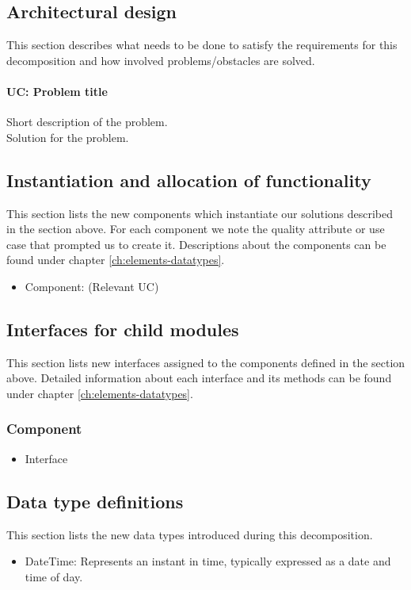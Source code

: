 \subsection{Architectural design}
    This section describes what needs to be done to satisfy the requirements for
    this decomposition and how involved problems/obstacles are solved.

    \paragraph{UC: Problem title}
        Short description of the problem.\\
        Solution for the problem.


\subsection{Instantiation and allocation of functionality}
    This section lists the new components which instantiate our solutions
    described in the section above. For each component we note the quality
    attribute or use case that prompted us to create it. Descriptions about
    the components can be found under chapter \ref{ch:elements-datatypes}. \\

    \begin{itemize}
        \item Component: (Relevant UC)
    \end{itemize}


\subsection{Interfaces for child modules}
    This section lists new interfaces assigned to the components defined
    in the section above. Detailed information about each interface and
    its methods can be found under chapter \ref{ch:elements-datatypes}. \\

    \subsubsection{Component}
        \begin{itemize}
            \item Interface
        \end{itemize}

\subsection{Data type definitions}
    This section lists the new data types introduced during this decomposition.

    \begin{itemize}
        \item DateTime: Represents an instant in time, typically expressed as a date and time of day.
    \end{itemize}
